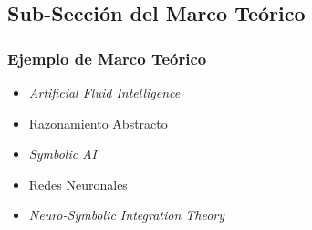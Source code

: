 \subsection{Sub-Sección del Marco Teórico} %
\label{sec:subseccion-marco-teorico} %

\begin{frame}
    \frametitle{Ejemplo de Marco Teórico}
    \begin{itemize}
        \item \textit{Artificial Fluid Intelligence}
        \item Razonamiento Abstracto
        \item \textit{Symbolic AI}
        \item Redes Neuronales
        \item \textit{Neuro-Symbolic Integration Theory}
    \end{itemize}
\end{frame}
